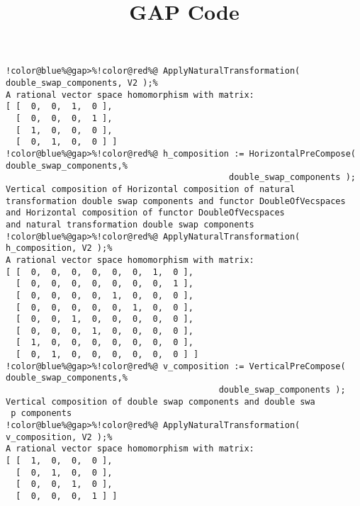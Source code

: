 \documentclass[12pt]{amsart}
\title{GAP Code}
\author{}
\begin{document}
\maketitle

\begin{Verbatim}[commandchars=!@\%,frame=single]
!color@blue%@gap>%!color@red%@ ApplyNaturalTransformation( double_swap_components, V2 );%
A rational vector space homomorphism with matrix: 
[ [  0,  0,  1,  0 ],
  [  0,  0,  0,  1 ],
  [  1,  0,  0,  0 ],
  [  0,  1,  0,  0 ] ]
!color@blue%@gap>%!color@red%@ h_composition := HorizontalPreCompose( double_swap_components,%
                                            double_swap_components );
Vertical composition of Horizontal composition of natural
transformation double swap components and functor DoubleOfVecspaces
and Horizontal composition of functor DoubleOfVecspaces
and natural transformation double swap components
!color@blue%@gap>%!color@red%@ ApplyNaturalTransformation( h_composition, V2 );%
A rational vector space homomorphism with matrix: 
[ [  0,  0,  0,  0,  0,  0,  1,  0 ],
  [  0,  0,  0,  0,  0,  0,  0,  1 ],
  [  0,  0,  0,  0,  1,  0,  0,  0 ],
  [  0,  0,  0,  0,  0,  1,  0,  0 ],
  [  0,  0,  1,  0,  0,  0,  0,  0 ],
  [  0,  0,  0,  1,  0,  0,  0,  0 ],
  [  1,  0,  0,  0,  0,  0,  0,  0 ],
  [  0,  1,  0,  0,  0,  0,  0,  0 ] ]
!color@blue%@gap>%!color@red%@ v_composition := VerticalPreCompose( double_swap_components,%
                                          double_swap_components );
Vertical composition of double swap components and double swa
 p components
!color@blue%@gap>%!color@red%@ ApplyNaturalTransformation( v_composition, V2 );%
A rational vector space homomorphism with matrix: 
[ [  1,  0,  0,  0 ],
  [  0,  1,  0,  0 ],
  [  0,  0,  1,  0 ],
  [  0,  0,  0,  1 ] ]
\end{Verbatim}
\end{document}
